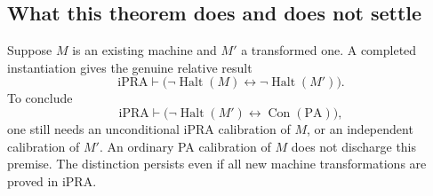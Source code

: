 \subsection{What this theorem does and does not settle}

Suppose $M$ is an existing machine and $M'$ a transformed one. A completed
instantiation gives the genuine relative result
\[
 \mathrm{iPRA}\vdash
 \bigl(\neg\operatorname{Halt}(M)\leftrightarrow
       \neg\operatorname{Halt}(M')\bigr).
\]
To conclude
\[
 \mathrm{iPRA}\vdash
 \bigl(\neg\operatorname{Halt}(M')\leftrightarrow
       \operatorname{Con}(\mathrm{PA})\bigr),
\]
one still needs an unconditional $\mathrm{iPRA}$ calibration of $M$, or
an independent calibration of $M'$. An ordinary PA calibration of $M$
does not discharge this premise. The distinction persists even if all
new machine transformations are proved in $\mathrm{iPRA}$.

